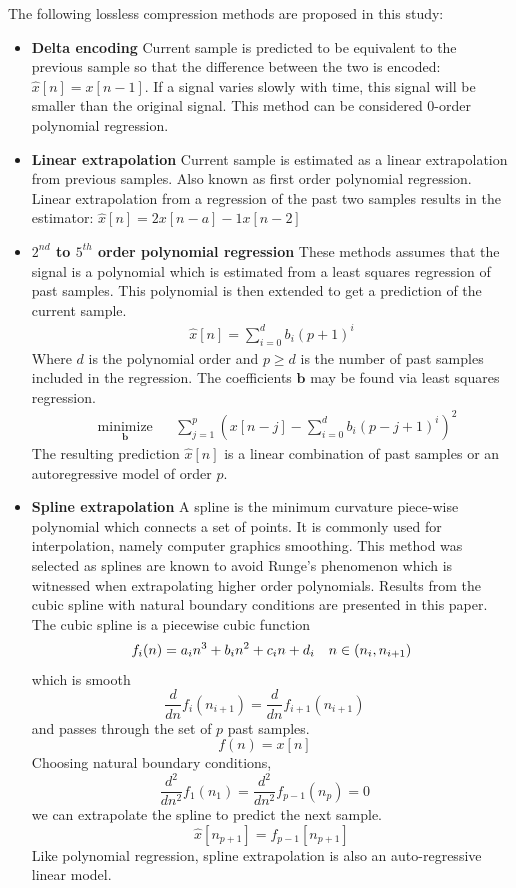 \documentclass[journal]{IEEEtran}
\begin{document}
The following lossless compression methods are proposed in this study:
\begin{itemize}
  \item \textbf{Delta encoding} Current sample is predicted to be equivalent to the previous sample so that the difference between the two is encoded: $\hat{x}[n] = x[n-1]$. If a signal varies slowly with time, this signal will be smaller than the original signal. This method can be considered 0-order polynomial regression.
  \item \textbf{Linear extrapolation} Current sample is estimated as a linear extrapolation from previous samples. Also known as first order polynomial regression. Linear extrapolation from a regression of the past two samples results in the estimator: $\hat{x}[n] = 2x[n-a] - 1x[n-2]$ 
  \item \textbf{\boldmath$2^{nd}$ to \boldmath$5^{th}$ order polynomial regression} These methods assumes that the signal is a polynomial which is estimated from a least squares regression of past samples. This polynomial is then extended to get a prediction of the current sample.
\begin{equation*}
\begin{aligned}
\hat{x}[n] = \sum_{i=0}^{d}b_i(p+1)^i
\end{aligned}
\end{equation*}
Where $d$ is the polynomial order and $p \geq d$ is the number of past samples included in the regression. The coefficients $\mathbf{b}$ may be found via least squares regression.
\begin{equation*}
\begin{aligned}
& \underset{\mathbf{b}}{\text{minimize}}
& & \sum_{j=1}^{p} \left( x[n-j] - \sum_{i=0}^{d} b_i(p-j+1)^i \right)^2
\end{aligned}
\end{equation*}
The resulting prediction $\hat{x}[n]$ is a linear combination of past samples or an autoregressive model of order $p$.


  \item \textbf{Spline extrapolation} A spline is the minimum curvature piece-wise polynomial which connects a set of points. It is commonly used for interpolation, namely computer graphics smoothing. This method was selected as splines are known to avoid Runge's phenomenon which is witnessed when extrapolating higher order polynomials. Results from the cubic spline with natural boundary conditions are presented in this paper. The cubic spline is a piecewise cubic function 
$$
f_i(n) = a_in^3  + b_in^2 + c_in + d_i \quad n \in(n_i, n_{i+1}) \\
$$
which is smooth
$$
\frac{d}{dn} f_i(n_{i+1}) = \frac{d}{dn} f_{i+1}(n_{i+1}) \quad
$$
and passes through the set of $p$ past samples.
$$
f(n) = x[n] \quad
$$
Choosing natural boundary conditions,
$$
\frac{d^2}{dn^2}f_1(n_1) = \frac{d^2}{dn^2}f_{p-1}(n_p) = 0 \quad
$$
we can extrapolate the spline to predict the next sample.
$$
\hat{x}[n_{p+1}] = f_{p-1}[n_{p+1}]
$$
Like polynomial regression, spline extrapolation is also an auto-regressive linear model.
\end{itemize}
\end{document}
